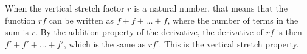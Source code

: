 When the vertical stretch factor $r$ is a natural number, that means
that the function $rf$ can be written as $f+f+\ldots+f$, where the
number of terms in the sum is $r$. By the addition property of the
derivative, the derivative of $rf$ is then $f'+f'+\ldots+f'$, which
is the same as $rf'$. This is the vertical stretch property.
